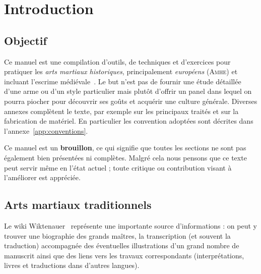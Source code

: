 \chapter{Introduction}


\section{Objectif}


Ce manuel est une compilation d'outils, de techniques et d'exercices pour pratiquer les \emph{arts martiaux historiques}, principalement \emph{européens} (\textsc{Amhe}) et incluant l'escrime médiévale~\footnotemark{}.
Le but n'est pas de fournir une étude détaillée d'une arme ou d'un style particulier mais plutôt d'offrir un panel dans lequel on pourra piocher pour découvrir ses goûts et acquérir une culture générale.
Diverses annexes complètent le texte, par exemple sur les principaux traités et sur la fabrication de matériel.
En particulier les convention adoptées sont décrites dans l'annexe~\ref{app:conventions}.

Ce manuel est un \textbf{brouillon}, ce qui signifie que toutes les sections ne sont pas également bien présentées ni complètes.
Malgré cela nous pensons que ce texte peut servir même en l'état actuel ; toute critique ou contribution visant à l'améliorer est appréciée.


\section{Arts martiaux traditionnels}




Le wiki Wiktenauer~\cite{wiktenauer} représente une importante source d'informations : on peut y trouver une biographie des grands maîtres, la transcription (et souvent la traduction) accompagnée des éventuelles illustrations d'un grand nombre de manuscrit ainsi que des liens vers les travaux correspondants (interprétations, livres et traductions dans d'autres langues).

